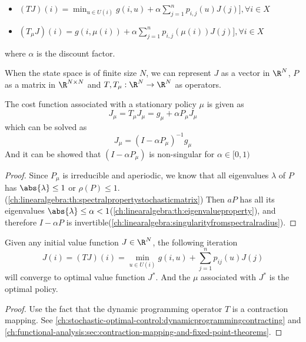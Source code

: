 \begin{refsection}
\begin{definition}\hfill
	\begin{itemize}
		\item $(TJ)(i) = \min_{u\in U(i)} g(i,u) + \alpha \sum_{j=1}^n p_{i,j}(u)J(j)],\forall i\in X$
		\item $(T_\mu J)(i) =  g(i,\mu(i)) + \alpha \sum_{j=1}^n p_{i,j}(\mu(i))J(j)],\forall i\in X$
	\end{itemize}
where $\alpha$ is the discount factor.
\end{definition}

\begin{remark}
When the state space is of finite size $N$, we can represent $J$ as a vector in $\R^N$, $P$ as a matrix in $\R^{N\times N}$ and $T, T_\mu:\R^N\to \R^N$ as operators. 
\end{remark}


\begin{lemma}
	 The cost function associated with a stationary policy $\mu$ is given as 
	$$J_\mu = T_\mu J_\mu = g_\mu + \alpha P_\mu J_\mu$$
	which can be solved as
	$$J_\mu = (I - \alpha P_\mu)^{-1} g_\mu$$
	And it can be showed that $(I - \alpha P_\mu)$ is non-singular for $\alpha \in [0,1)$
\end{lemma}
\begin{proof}
Since $P_\mu$ is irreducible and aperiodic, we know that all eigenvalues $\lambda$ of $P$ has $\abs{\lambda} \leq 1$ or $\rho(P) \leq 1$.(\autoref{ch:linearalgebra:th:spectralpropertystochasticmatrix}) Then $aP$ has all its eigenvalues $\abs{\lambda} \leq \alpha < 1$(\autoref{ch:linearalgebra:th:eigenvalueproperty}), and therefore $I-\alpha P$ is invertible(\autoref{ch:linearalgebra:singularityfromspectralradius}).  
\end{proof}

\begin{theorem}
Given any initial value function $J\in \R^N$, the following iteration 
$$J(i) = (TJ)(i) = \min_{u\in U(i)} g(i,u) + \sum_{j=1}^n p_{ij}(u)J(j)$$
will converge to optimal value function $J^*$. And the $\mu$ associated with $J^*$ is the optimal policy.
\end{theorem}
\begin{proof}
Use the fact that the dynamic programming operator $T$ is a contraction mapping. See \autoref{ch:stochastic-optimal-control:dynamicprogrammingcontracting} and \autoref{ch:functional-analysis:sec:contraction-mapping-and-fixed-point-theorems}.
\end{proof}



\end{refsection}
